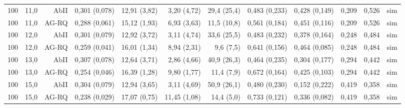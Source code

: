 \begin{tabular}{lrrrrrrrrrrr}
100 & 11{,}0 & AbII & 0{,}301 (0{,}078) & 12{,}91 (3{,}82) & 3{,}20 (4{,}72) & 29{,}4 (25{,}4) & 0{,}483 (0{,}233) & 0{,}428 (0{,}149) & 0{,}209 & 0{,}526 & sim \\
100 & 11{,}0 & AG-RQ & 0{,}288 (0{,}061) & 15{,}12 (1{,}93) & 6{,}93 (3{,}63) & 11{,}5 (10{,}8) & 0{,}561 (0{,}184) & 0{,}451 (0{,}116) & 0{,}209 & 0{,}526 & sim \\
100 & 12{,}0 & AbII & 0{,}301 (0{,}079) & 12{,}92 (3{,}72) & 3{,}11 (4{,}74) & 33{,}6 (25{,}5) & 0{,}483 (0{,}232) & 0{,}378 (0{,}164) & 0{,}248 & 0{,}484 & sim \\
100 & 12{,}0 & AG-RQ & 0{,}259 (0{,}041) & 16{,}01 (1{,}34) & 8{,}94 (2{,}31) & 9{,}6 (7{,}5) & 0{,}641 (0{,}156) & 0{,}464 (0{,}085) & 0{,}248 & 0{,}484 & sim \\
100 & 13{,}0 & AbII & 0{,}307 (0{,}078) & 12{,}64 (3{,}71) & 2{,}86 (4{,}66) & 40{,}9 (26{,}3) & 0{,}464 (0{,}235) & 0{,}304 (0{,}177) & 0{,}294 & 0{,}442 & sim \\
100 & 13{,}0 & AG-RQ & 0{,}254 (0{,}046) & 16{,}39 (1{,}28) & 9{,}80 (1{,}77) & 11{,}4 (7{,}9) & 0{,}672 (0{,}164) & 0{,}425 (0{,}103) & 0{,}294 & 0{,}442 & sim \\
100 & 15{,}0 & AbII & 0{,}304 (0{,}079) & 12{,}94 (3{,}65) & 3{,}11 (4{,}69) & 50{,}9 (26{,}1) & 0{,}480 (0{,}230) & 0{,}152 (0{,}222) & 0{,}419 & 0{,}358 & sim \\
100 & 15{,}0 & AG-RQ & 0{,}238 (0{,}029) & 17{,}07 (0{,}75) & 11{,}45 (1{,}08) & 14{,}4 (5{,}0) & 0{,}733 (0{,}121) & 0{,}336 (0{,}082) & 0{,}419 & 0{,}358 & sim \\
\bottomrule
\end{tabular}
